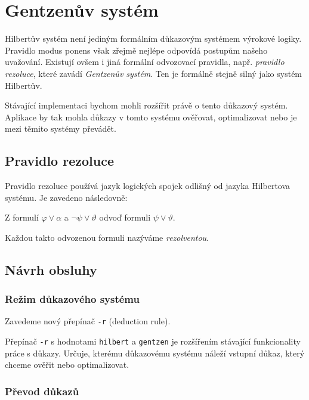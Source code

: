 \documentclass[thesis=B,czech,hidelinks]{thesis}[2012/06/26]
\begin{document}
\section{Gentzenův systém}

Hilbertův systém není jediným formálním důkazovým systémem výrokové logiky. Pravidlo modus ponens však zřejmě nejlépe odpovídá postupům našeho uvažování\cite{sochor}. Existují ovšem i jiná formální odvozovací pravidla, např. \emph{pravidlo rezoluce}, které zavádí \emph{Gentzenův systém}. Ten je formálně stejně silný jako systém Hilbertův\cite{stary}.

Stávající implementaci bychom mohli rozšířit právě o tento důkazový systém. Aplikace by tak mohla důkazy v tomto systému ověřovat, optimalizovat nebo je mezi těmito systémy převádět.

\subsection{Pravidlo rezoluce}

Pravidlo rezoluce používá jazyk logických spojek odlišný od jazyka Hilbertova systému. Je zavedeno následovně:

\begin{dfn}
Z formulí $\varphi \vee \alpha$ a $\neg \psi \vee \vartheta$ odvoď formuli $\psi \vee \vartheta$.
\end{dfn}

Každou takto odvozenou formuli nazýváme \emph{rezolventou}\cite{stary}.

\subsection{Návrh obsluhy}

\subsubsection{Režim důkazového systému}

Zavedeme nový přepínač \texttt{-r} (deduction rule).

Přepínač \texttt{-r} s hodnotami \texttt{hilbert} a \texttt{gentzen} je rozšířením stávající funkcionality práce s důkazy. Určuje, kterému důkazovému systému náleží vstupní důkaz, který chceme ověřit nebo optimalizovat.

\subsubsection{Převod důkazů}
\end{document}
